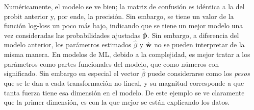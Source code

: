 \documentclass[../Main/Main.tex]{subfiles}
\begin{document}
Numéricamente, el modelo se ve bien; la matriz de confusión es idéntica a la del probit anterior y, por ende, la precisión. Sin embargo, se tiene un valor de la función log-loss un poco más bajo, indicando que se tiene un mejor modelo una vez consideradas las probabilidades ajustadas $\hat{\mathbf{p}}$. Sin embargo, a diferencia del modelo anterior, los parámetros estimados $\hat{\beta}$ y $\hat{\mathbf{w}}$ no se pueden interpretar de la misma manera. En modelos de ML, debido a la complejidad, es mejor tratar a los parámetros como partes funcionales del modelo, que como números con significado. Sin embargo en especial el vector $\hat{\beta}$ puede considerarse como los \textit{pesos} que se le dan a cada transformación no lineal, y su magnitud corresponde a que tanta fuerza tiene esa dimensión en el modelo. De este ejemplo se ve claramente que la primer dimensión, es con la que mejor se están explicando los datos.\\
\end{document}

